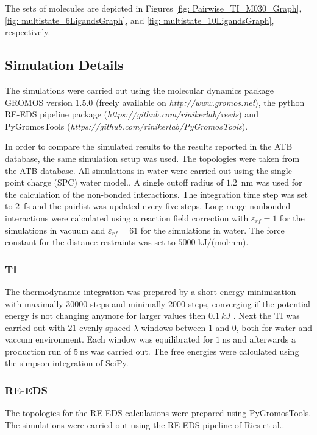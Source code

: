 The sets of molecules are depicted in Figures \ref{fig: Pairwise_TI_M030_Graph}, \ref{fig: multistate_6LigandsGraph}, and \ref{fig: multistate_10LigandsGraph}, respectively.

\subsection{Simulation Details}
The simulations were carried out using the molecular dynamics package GROMOS version 1.5.0 (freely available on \textit{http://www.gromos.net}),
the python RE-EDS pipeline package (\textit{https://github.com/rinikerlab/reeds}) 
and PyGromosTools (\textit{https://github.com/rinikerlab/PyGromosTools}). \cite{Schmid2012, Ries2021, Lehner2021} 

In order to compare the simulated results to the results reported in the ATB database, the same simulation setup was used. The topologies were taken from the ATB database. All simulations in water were carried out using the single-point charge (SPC) water model.\cite{Berendsen1981}. A single cutoff radius of $1.2$~nm was used for the calculation of the non-bonded interactions. The integration time step was set to $2$~fs and the pairlist was updated every five steps. Long-range nonbonded interactions were calculated using a reaction field correction with $\varepsilon_{rf}=1$ for the simulations in vacuum and $\varepsilon_{rf}=61$ for the simulations in water.\cite{tironi1995} The force constant for the distance restraints was set to $5000$ kJ$/($mol$\cdot$nm$)$.

\subsubsection{TI}
The thermodynamic integration was prepared by a short energy minimization with maximally 30000 steps and minimally $2000$ steps, converging if the potential energy is not changing anymore for larger values then $0.1~kJ$ . Next the TI was carried out with $21$ evenly spaced $\lambda$-windows between $1$ and $0$, both for water and vaccum environment. Each window was equilibrated for $1~$ns and afterwards a production run of $5~$ns was carried out. The free energies were calculated using the simpson integration of SciPy.\cite{Virtanen2020}

\subsubsection{RE-EDS}
The topologies for the RE-EDS calculations were prepared using PyGromosTools.\cite{Lehner2021} The simulations were carried out using the RE-EDS pipeline of Ries et al.\cite{Ries2021}.

